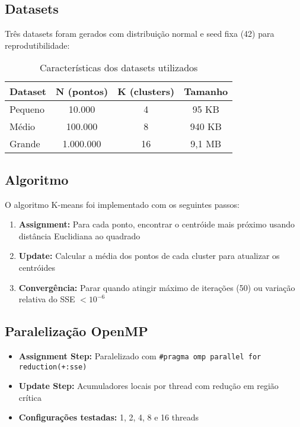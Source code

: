 \documentclass[12pt,a4paper]{article}
\begin{document}
\subsection{Datasets}

Três datasets foram gerados com distribuição normal e seed fixa (42) para reprodutibilidade:

\begin{table}[H]
\centering
\begin{tabular}{lccc}
\toprule
\textbf{Dataset} & \textbf{N (pontos)} & \textbf{K (clusters)} & \textbf{Tamanho} \\
\midrule
Pequeno & 10.000 & 4 & 95 KB \\
Médio & 100.000 & 8 & 940 KB \\
Grande & 1.000.000 & 16 & 9,1 MB \\
\bottomrule
\end{tabular}
\caption{Características dos datasets utilizados}
\end{table}

\subsection{Algoritmo}

O algoritmo K-means foi implementado com os seguintes passos:

\begin{enumerate}
    \item \textbf{Assignment:} Para cada ponto, encontrar o centróide mais próximo usando distância Euclidiana ao quadrado
    \item \textbf{Update:} Calcular a média dos pontos de cada cluster para atualizar os centróides
    \item \textbf{Convergência:} Parar quando atingir máximo de iterações (50) ou variação relativa do SSE $< 10^{-6}$
\end{enumerate}

\subsection{Paralelização OpenMP}

\begin{itemize}
    \item \textbf{Assignment Step:} Paralelizado com \texttt{\#pragma omp parallel for reduction(+:sse)}
    \item \textbf{Update Step:} Acumuladores locais por thread com redução em região crítica
    \item \textbf{Configurações testadas:} 1, 2, 4, 8 e 16 threads
\end{itemize}
\end{document}
